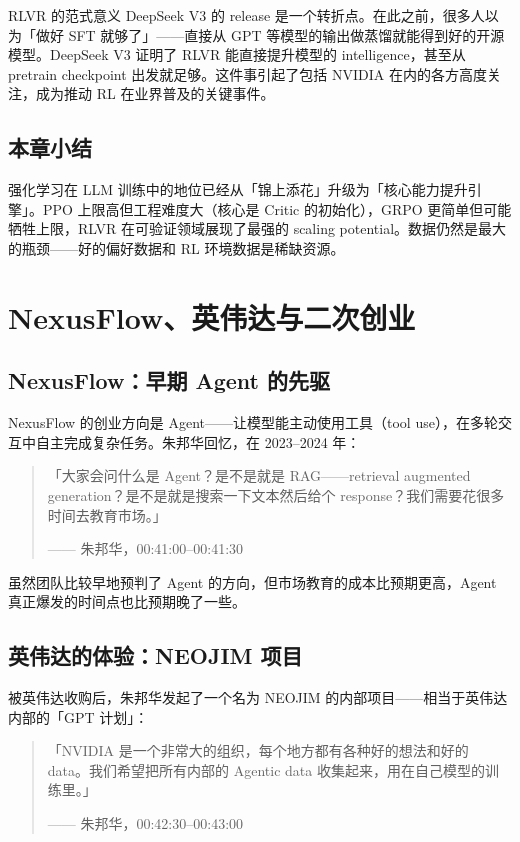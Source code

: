 \documentclass[a4paper]{article}
\begin{document}
\begin{importantbox}{RLVR 的范式意义}
DeepSeek V3 的 release 是一个转折点。在此之前，很多人以为「做好 SFT 就够了」——直接从 GPT 等模型的输出做蒸馏就能得到好的开源模型。DeepSeek V3 证明了 RLVR 能直接提升模型的 intelligence，甚至从 pretrain checkpoint 出发就足够。这件事引起了包括 NVIDIA 在内的各方高度关注，成为推动 RL 在业界普及的关键事件。
\end{importantbox}

\subsection{本章小结}
强化学习在 LLM 训练中的地位已经从「锦上添花」升级为「核心能力提升引擎」。PPO 上限高但工程难度大（核心是 Critic 的初始化），GRPO 更简单但可能牺牲上限，RLVR 在可验证领域展现了最强的 scaling potential。数据仍然是最大的瓶颈——好的偏好数据和 RL 环境数据是稀缺资源。

\section{NexusFlow、英伟达与二次创业}

\subsection{NexusFlow：早期 Agent 的先驱}

NexusFlow 的创业方向是 Agent——让模型能主动使用工具（tool use），在多轮交互中自主完成复杂任务。朱邦华回忆，在 2023--2024 年：

\begin{quote}
「大家会问什么是 Agent？是不是就是 RAG——retrieval augmented generation？是不是就是搜索一下文本然后给个 response？我们需要花很多时间去教育市场。」\par
\hfill —— 朱邦华，00:41:00--00:41:30
\end{quote}

虽然团队比较早地预判了 Agent 的方向，但市场教育的成本比预期更高，Agent 真正爆发的时间点也比预期晚了一些。

\subsection{英伟达的体验：NEOJIM 项目}

被英伟达收购后，朱邦华发起了一个名为 NEOJIM 的内部项目——相当于英伟达内部的「GPT 计划」：

\begin{quote}
「NVIDIA 是一个非常大的组织，每个地方都有各种好的想法和好的 data。我们希望把所有内部的 Agentic data 收集起来，用在自己模型的训练里。」\par
\hfill —— 朱邦华，00:42:30--00:43:00
\end{quote}
\end{document}
